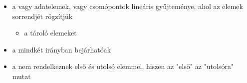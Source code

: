 \documentclass[main.tex]{subfiles}
\begin{document}
  \begin{itemize}
    \item a  vagy 
    adatelemek, vagy csomópontok lineáris gyűjteménye,
    ahol az elemek sorrendjét rögzítjük
    \begin{itemize}
      \item a  tároló elemeket
    \end{itemize}

    \item a  mindkét irányban bejárhatóak
    
    \item a  nem rendelkeznek
    első és utolsó elemmel, hiszen az "első" az "utolsóra" mutat
  \end{itemize}
\end{document}
